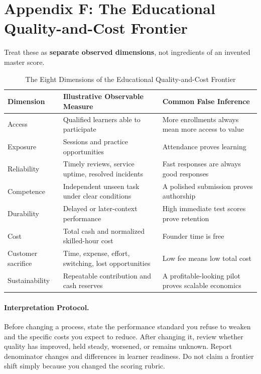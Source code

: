 \section*{Appendix F: The Educational Quality-and-Cost Frontier}

Treat these as \textbf{separate observed dimensions}, not ingredients of an invented master score.

\begin{table}[t]
\centering
\small
\caption{The Eight Dimensions of the Educational Quality-and-Cost Frontier}
\begin{tabularx}{\textwidth}{p{}p{}X}
\toprule
\textbf{Dimension} & \textbf{Illustrative Observable Measure} & \textbf{Common False Inference} \\
\midrule
Access & Qualified learners able to participate & More enrollments always mean more access to value \\
Exposure & Sessions and practice opportunities & Attendance proves learning \\
Reliability & Timely reviews, service uptime, resolved incidents & Fast responses are always good responses \\
Competence & Independent unseen task under clear conditions & A polished submission proves authorship \\
Durability & Delayed or later-context performance & High immediate test scores prove retention \\
Cost & Total cash and normalized skilled-hour cost & Founder time is free \\
Customer sacrifice & Time, expense, effort, switching, lost opportunities & Low fee means low total cost \\
Sustainability & Repeatable contribution and cash reserves & A profitable-looking pilot proves scalable economics \\
\bottomrule
\end{tabularx}
\end{table}

\paragraph*{Interpretation Protocol.} Before changing a process, state the performance standard you refuse to weaken and the specific costs you expect to reduce. After changing it, review whether quality has improved, held steady, worsened, or remains unknown. Report denominator changes and differences in learner readiness. Do not claim a frontier shift simply because you changed the scoring rubric.

